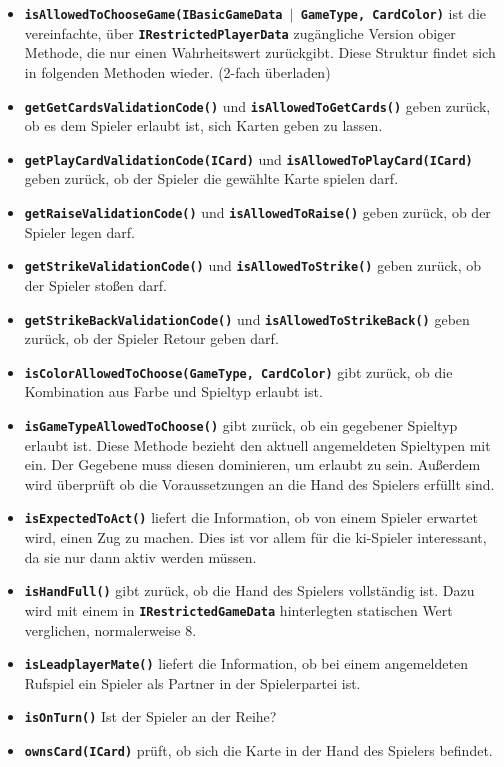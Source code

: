 \documentclass[
							a4paper, 
							11pt, 
							openany, 
							liststotoc,
							parskip=half, 
   							headings=normal
						]{scrreprt}
\begin{document}
{\begin{itemize}
	\item \textbf{\texttt{isAllowedToChooseGame(IBasicGameData $\mid$ GameType, CardColor)}} ist die  vereinfachte, über \textbf{\texttt{IRestrictedPlayerData}} zugängliche Version obiger Methode, die nur einen Wahrheitswert zurückgibt. Diese Struktur findet sich in folgenden Methoden wieder. (2-fach überladen)
	\item \textbf{\texttt{getGetCardsValidationCode()}} und \textbf{\texttt{isAllowedToGetCards()}} geben zurück, ob es dem Spieler erlaubt ist, sich Karten geben zu lassen.
	\item \textbf{\texttt{getPlayCardValidationCode(ICard)}} und \textbf{\texttt{isAllowedToPlayCard(ICard)}} geben zurück, ob der Spieler die gewählte Karte spielen darf.
	\item \textbf{\texttt{getRaiseValidationCode()}} und \textbf{\texttt{isAllowedToRaise()}} geben zurück, ob der Spieler legen darf.
	\item \textbf{\texttt{getStrikeValidationCode()}} und \textbf{\texttt{isAllowedToStrike()}} geben zurück, ob der Spieler stoßen darf.
	\item \textbf{\texttt{getStrikeBackValidationCode()}} und \textbf{\texttt{isAllowedToStrikeBack()}} geben zurück, ob der Spieler Retour geben darf.	
	\item \textbf{\texttt{isColorAllowedToChoose(GameType, CardColor)}} gibt zurück, ob die Kombination aus Farbe und Spieltyp erlaubt ist.
	\item \textbf{\texttt{isGameTypeAllowedToChoose()}} gibt zurück, ob ein gegebener Spieltyp erlaubt ist. Diese Methode bezieht den aktuell angemeldeten Spieltypen mit ein. Der Gegebene muss diesen dominieren, um erlaubt zu sein. Außerdem wird über\-prüft ob die Voraussetzungen an die Hand des Spielers erfüllt sind.		
	\item \textbf{\texttt{isExpectedToAct()}} liefert die Information, ob von einem Spieler erwartet wird, einen Zug zu machen. Dies ist vor allem für die \acs{ki}-Spieler interessant, da sie nur dann aktiv werden müssen.	
	\item \textbf{\texttt{isHandFull()}} gibt zurück, ob die Hand des Spielers vollständig ist. Dazu wird mit einem in \textbf{\texttt{IRestrictedGameData}} hinterlegten statischen Wert verglichen, normalerweise 8.
	\item \textbf{\texttt{isLeadplayerMate()}} liefert die Information, ob bei einem angemeldeten Rufspiel ein Spieler als Partner in der Spielerpartei ist.
	\item \textbf{\texttt{isOnTurn()}} Ist der Spieler an der Reihe?
	\item \textbf{\texttt{ownsCard(ICard)}} prüft, ob sich die Karte in der Hand des Spielers befindet.
\end{itemize}\bigskip

}
\end{document}
